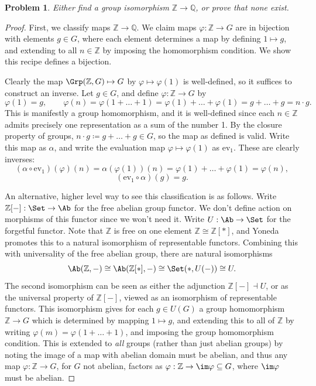 \documentclass[11pt, letterpaper]{article}
\theoremstyle{plain}
\newtheorem{problem}{Problem}[section]
\begin{document}
\begin{problem}
	Either find a group isomorphism $\mathbb{Z} \to \mathbb{Q} $, or prove that none exist.
\end{problem}
\begin{proof}
	First, we classify maps $\mathbb{Z} \to \mathbb{Q}$. We claim maps $\varphi : \mathbb{Z}  \to G $ are in bijection with elements $g\in G$, where each element determines a map by defining $1\mapsto g$, and extending to all $n\in \mathbb{Z} $ by imposing the homomorphism condition. We show this recipe defines a bijection.

	Clearly the map $\Grp (\mathbb{Z} ,G)\mapsto G$ by $\varphi \mapsto \varphi (1)$ is well-defined, so it suffices to construct an inverse. Let $g\in G$, and define $\varphi : \mathbb{Z}  \to G$ by
	\[
		\varphi (1)=g,\qquad \varphi (n) = \varphi (1 + \ldots + 1)=\varphi (1) + \ldots + \varphi (1) = g + \ldots + g = n\cdot g
	.\]
	This is manifestly a group homomorphism, and it is well-defined since each $n\in\mathbb{Z} $ admits precisely one representation as a sum of the number 1. By the closure property of groups, $n\cdot g\coloneqq g + \ldots + g \in G$, so the map as defined is valid. Write this map as $\alpha $, and write the evaluation map $\varphi \mapsto \varphi (1)$ as $\mathrm{ev}_1$. These are clearly inverses:
	\[
		(\alpha \circ \mathrm{ev} _1)(\varphi )(n)=\alpha (\varphi (1))(n)=\varphi (1) + \ldots + \varphi (1) = \varphi (n),
	\]
	\[
		(\mathrm{ev}_1 \circ \alpha )(g)=g
	.\]
	

	An alternative, higher level way to see this classification is as follows. Write $\mathbb{Z} [-]: \Set  \to \Ab $ for the free abelian group functor. We don't define action on morphisms of this functor since we won't need it. Write $U : \Ab  \to \Set $ for the forgetful functor. Note that $\mathbb{Z} $ is free on one element $\mathbb{Z} \cong \mathbb{Z} [*]$, and Yoneda promotes this to a natural isomorphism of representable functors. Combining this with universality of the free abelian group, there are natural isomorphisms
	\[
		\Ab (\mathbb{Z} ,-)\cong \Ab (\mathbb{Z} [*],-)\cong \Set (*,U(-))\cong U
	.\]
	The second isomorphism can be seen as either the adjunction $\mathbb{Z} [-]\dashv U$, or as the universal property of $\mathbb{Z} [-]$, viewed as an isomorphism of representable functors. This isomorphism gives for each $g\in U(G)$ a group homomorphism $\mathbb{Z} \to G$ which is determined by mapping $1\mapsto g$, and extending this to all of $\mathbb{Z} $ by writing $\varphi (m)=\varphi (1 + \ldots + 1)$, and imposing the group homomorphism condition. This is extended to \emph{all} groups (rather than just abelian groups) by noting the image of a map with abelian domain must be abelian, and thus any map $\varphi :\mathbb{Z} \to G$, for $G$ not abelian, factors as $\varphi :\mathbb{Z} \to \im \varphi  \subseteq G$, where $\im \varphi $ must be abelian.


\end{proof}
\end{document}
